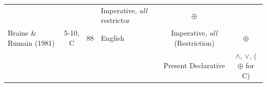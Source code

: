 \documentclass[oneside]{report}
\theoremstyle{definition}
\theoremstyle{definition}
\theoremstyle{definition}
\theoremstyle{remark}
\begin{document}
\begin{longtable}[]{@{}lcclcc@{}}
\begin{minipage}[t]{0.09\columnwidth}
\strut
\end{minipage} & \begin{minipage}[t]{0.09\columnwidth}\centering\strut
\strut
\end{minipage} & \begin{minipage}[t]{0.06\columnwidth}\raggedright\strut
\strut
\end{minipage} & \begin{minipage}[t]{0.31\columnwidth}\centering\strut
Imperative, \emph{all} restrictor\strut
\end{minipage} & \begin{minipage}[t]{0.12\columnwidth}\centering\strut
\(\oplus\)\strut
\end{minipage}\tabularnewline
\begin{minipage}[t]{0.17\columnwidth}\raggedright\strut
Braine \& Rumain (1981)\strut
\end{minipage} & \begin{minipage}[t]{0.09\columnwidth}\centering\strut
5-10, C\strut
\end{minipage} & \begin{minipage}[t]{0.09\columnwidth}\centering\strut
88\strut
\end{minipage} & \begin{minipage}[t]{0.06\columnwidth}\raggedright\strut
English\strut
\end{minipage} & \begin{minipage}[t]{0.31\columnwidth}\centering\strut
Imperative, \emph{all} (Restriction)\strut
\end{minipage} & \begin{minipage}[t]{0.12\columnwidth}\centering\strut
\(\oplus\)\strut
\end{minipage}\tabularnewline
\begin{minipage}[t]{0.17\columnwidth}\raggedright\strut
\strut
\end{minipage} & \begin{minipage}[t]{0.09\columnwidth}\centering\strut
\strut
\end{minipage} & \begin{minipage}[t]{0.09\columnwidth}\centering\strut
\strut
\end{minipage} & \begin{minipage}[t]{0.06\columnwidth}\raggedright\strut
\strut
\end{minipage} & \begin{minipage}[t]{0.31\columnwidth}\centering\strut
Present Declarative\strut
\end{minipage} & \begin{minipage}[t]{0.12\columnwidth}\centering\strut
\(\land\), \(\lor\), (\(\oplus\) for C)\strut
\end{minipage}\tabularnewline
\bottomrule
\end{longtable}
\end{document}
